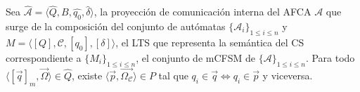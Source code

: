 \begin{lemma}
\label{lema1} 
Sea $\widehat{\mathcal{A}}=\langle \widehat{Q}, B, \widehat{q_0}, \widehat{\delta} \rangle$, la proyección de comunicación interna del AFCA $\mathcal{A}$ que surge de la composición del conjunto de autómatas  $\{\mathcal{A}_i\}_{1 \leq i \leq n}$  y $M= \langle [Q], \mathcal{C}, [q_0], [\delta] \rangle$, el LTS que representa la semántica del CS correspondiente a $\{M_i\}_{1 \leq i \leq n}$, el conjunto de mCFSM de $\{\mathcal{A}\}_{1 \leq i \leq n}$. Para todo $\langle [\overrightarrow{q}]_m, \overrightarrow{\Omega} \rangle \in \widehat{Q}$, existe $\langle \overrightarrow{p}, \overrightarrow{\Omega_{\mathcal{C}}} \rangle \in P$ tal que $q_i \in \overrightarrow{q} \iff q_i \in \overrightarrow{p}$ y viceversa. 
\end{lemma}
